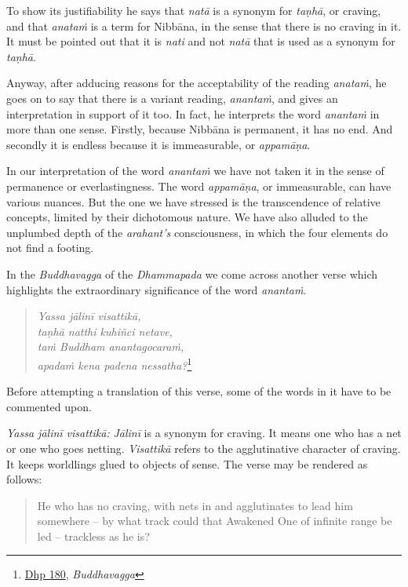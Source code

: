 To show its justifiability he says that \emph{natā} is a synonym for \emph{taṇhā}, or craving, and that \emph{anataṁ} is a term for Nibbāna, in the sense that there is no craving in it. It must be pointed out that it is \emph{nati} and not \emph{natā} that is used as a synonym for \emph{taṇhā}.

Anyway, after adducing reasons for the acceptability of the reading \emph{anataṁ}, he goes on to say that there is a variant reading, \emph{anantaṁ}, and gives an interpretation in support of it too. In fact, he interprets the word \emph{anantaṁ} in more than one sense. Firstly, because Nibbāna is permanent, it has no end. And secondly it is endless because it is immeasurable, or \emph{appamāṇa}.

In our interpretation of the word \emph{anantaṁ} we have not taken it in the sense of permanence or everlastingness. The word \emph{appamāṇa}, or immeasurable, can have various nuances. But the one we have stressed is the transcendence of relative concepts, limited by their dichotomous nature. We have also alluded to the unplumbed depth of the \emph{arahant's} consciousness, in which the four elements do not find a footing.

In the \emph{Buddhavagga} of the \emph{Dhammapada} we come across another verse which highlights the extraordinary significance of the word \emph{anantaṁ}.

\begin{quote}
\emph{Yassa jālinī visattikā,}\\
\emph{taṇhā natthi kuhiñci netave,}\\
\emph{taṁ Buddham anantagocaraṁ,}\\
\emph{apadaṁ kena padena nessatha?}\footnote{\href{https://suttacentral.net/dhp179-196/pli/ms}{Dhp 180}, \emph{Buddhavagga}}
\end{quote}

Before attempting a translation of this verse, some of the words in it have to be commented upon.

\emph{Yassa jālinī visattikā:} \emph{Jālinī} is a synonym for craving. It means one who has a net or one who goes netting. \emph{Visattikā} refers to the agglutinative character of craving. It keeps worldlings glued to objects of sense. The verse may be rendered as follows:

\begin{quote}
He who has no craving, with nets in and agglutinates to lead him somewhere -- by what track could that Awakened One of infinite range be led -- trackless as he is?
\end{quote}

